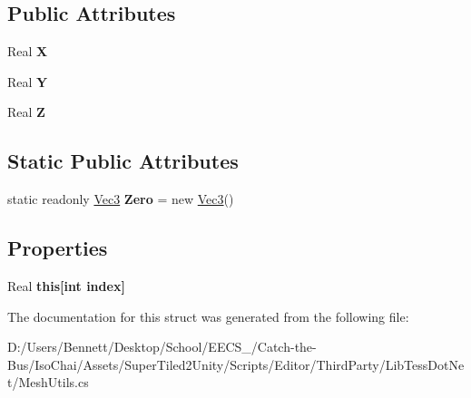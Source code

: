\subsection*{Public Attributes}
\begin{DoxyCompactItemize}
\item 
\mbox{\label{struct_super_tiled2_unity_1_1_editor_1_1_lib_tess_dot_net_1_1_vec3_a692e53252e08bc5dd6bfdef93dc7893c}} 
Real {\bfseries X}
\item 
\mbox{\label{struct_super_tiled2_unity_1_1_editor_1_1_lib_tess_dot_net_1_1_vec3_ab09fb5e521f28f8f42c0f55b69cc20b2}} 
Real {\bfseries Y}
\item 
\mbox{\label{struct_super_tiled2_unity_1_1_editor_1_1_lib_tess_dot_net_1_1_vec3_a7e4817ca2a6d9e3669862804b4db36f0}} 
Real {\bfseries Z}
\end{DoxyCompactItemize}
\subsection*{Static Public Attributes}
\begin{DoxyCompactItemize}
\item 
\mbox{\label{struct_super_tiled2_unity_1_1_editor_1_1_lib_tess_dot_net_1_1_vec3_a585589741f006ac853e4be7916221edd}} 
static readonly \mbox{\hyperlink{struct_super_tiled2_unity_1_1_editor_1_1_lib_tess_dot_net_1_1_vec3}{Vec3}} {\bfseries Zero} = new \mbox{\hyperlink{struct_super_tiled2_unity_1_1_editor_1_1_lib_tess_dot_net_1_1_vec3}{Vec3}}()
\end{DoxyCompactItemize}
\subsection*{Properties}
\begin{DoxyCompactItemize}
\item 
\mbox{\label{struct_super_tiled2_unity_1_1_editor_1_1_lib_tess_dot_net_1_1_vec3_ac8733296c3597256eb3bac563ce30991}} 
Real {\bfseries this\mbox{[}int index\mbox{]}}
\end{DoxyCompactItemize}


The documentation for this struct was generated from the following file\+:\begin{DoxyCompactItemize}
\item 
D\+:/\+Users/\+Bennett/\+Desktop/\+School/\+E\+E\+C\+S\+\_/\+Catch-\/the-\/\+Bus/\+Iso\+Chai/\+Assets/\+Super\+Tiled2\+Unity/\+Scripts/\+Editor/\+Third\+Party/\+Lib\+Tess\+Dot\+Net/Mesh\+Utils.\+cs\end{DoxyCompactItemize}
